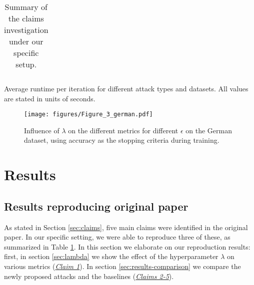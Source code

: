 \begin{table}[t!]
\begin{minipage}{.65\textwidth}
{\begin{tabular}{lccc}
         \end{tabular}}
         \caption{Average runtime per iteration for different attack types and datasets. All values are stated in units of seconds.}
        \label{tab:runtime}
    \end{minipage}
    \hfill
    \begin{minipage}{.3\textwidth}%
        \centering
        \caption{Summary of the claims investigation under our specific setup.}
        \label{tab:claims}
    \end{minipage} 
\end{table}



\begin{figure}[t!]
    \centering
    \texttt{[image: figures/Figure\_3\_german.pdf]}
    \caption{Influence of $\lambda$ on the different metrics for different $\epsilon$ on the German dataset, using accuracy as the stopping criteria during training.}
    \label{fig:effect-lambda-german}
\end{figure}

\section{Results}
\label{sec:results}

\subsection{Results reproducing original paper}
As stated in Section \ref{sec:claims}, five main claims were identified in the original paper. In our specific setting, we were able to reproduce three of these, as summarized in Table \ref{tab:claims}. In this section we elaborate on our reproduction results: first, in section \ref{sec:lambda} we show the effect of the hyperparameter $\lambda$ on various metrics (\hyperlink{claim-1}{\textit{Claim 1}}). In section \ref{sec:results-comparison} we compare the newly proposed attacks and the baselines (\hyperlink{claim-2}{\textit{Claims 2-5}}). 

